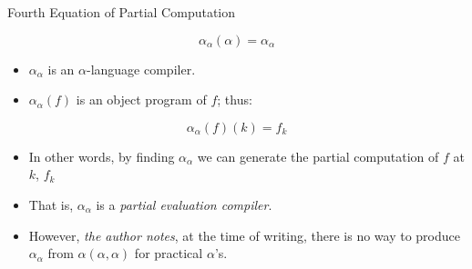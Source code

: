 \documentclass[aspectratio=169,dvipsnames]{beamer}
\begin{document}
\begin{frame}{Fourth Equation of Partial Computation}

    \[
        \alpha_\alpha(\alpha)=\alpha_\alpha    
    \]

    \begin{center}
    
        
    \end{center}
    


    \begin{itemize}
    \item $\alpha_\alpha$ is an $\alpha$-language compiler.
    \item $\alpha_\alpha(f)$ is an object program of $f$; thus:
    \end{itemize}

    \begin{equation}
    \alpha_\alpha(f)(k) =  f_k
    \end{equation}
    
    
\end{frame}

\begin{frame}

    \begin{itemize}
    \item In other words, by finding $\alpha_\alpha$ we can generate
    the partial computation of $f$ at $k$, $f_k$
    
    \item That is, $\alpha_\alpha$ is a \emph{partial evaluation compiler}.

    \item However, \emph{the author notes}, at the time of writing, 
    there is no way to produce $\alpha_\alpha$ from $\alpha(\alpha, \alpha)$
    for practical $\alpha$'s.
    \end{itemize}

\end{frame}
\end{document}
